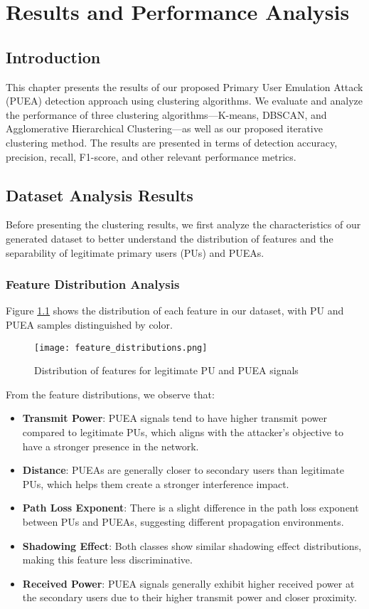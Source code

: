 \chapter{Results and Performance Analysis}

\section{Introduction}
This chapter presents the results of our proposed Primary User Emulation Attack (PUEA) detection approach using clustering algorithms. We evaluate and analyze the performance of three clustering algorithms—K-means, DBSCAN, and Agglomerative Hierarchical Clustering—as well as our proposed iterative clustering method. The results are presented in terms of detection accuracy, precision, recall, F1-score, and other relevant performance metrics.

\section{Dataset Analysis Results}
Before presenting the clustering results, we first analyze the characteristics of our generated dataset to better understand the distribution of features and the separability of legitimate primary users (PUs) and PUEAs.

\subsection{Feature Distribution Analysis}
Figure \ref{fig:feature_distributions} shows the distribution of each feature in our dataset, with PU and PUEA samples distinguished by color.

\begin{figure}[h]
    \centering
    \texttt{[image: feature\_distributions.png]}
    \caption{Distribution of features for legitimate PU and PUEA signals}
    \label{fig:feature_distributions}
\end{figure}

From the feature distributions, we observe that:
\begin{itemize}
    \item \textbf{Transmit Power}: PUEA signals tend to have higher transmit power compared to legitimate PUs, which aligns with the attacker's objective to have a stronger presence in the network.
    \item \textbf{Distance}: PUEAs are generally closer to secondary users than legitimate PUs, which helps them create a stronger interference impact.
    \item \textbf{Path Loss Exponent}: There is a slight difference in the path loss exponent between PUs and PUEAs, suggesting different propagation environments.
    \item \textbf{Shadowing Effect}: Both classes show similar shadowing effect distributions, making this feature less discriminative.
    \item \textbf{Received Power}: PUEA signals generally exhibit higher received power at the secondary users due to their higher transmit power and closer proximity.
\end{itemize}

